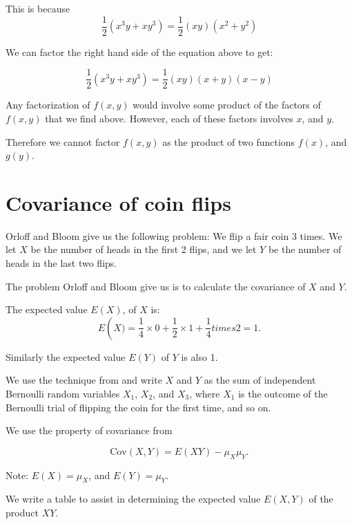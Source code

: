 \documentclass[a4paper,11pt]{article}
\begin{document}
This is because
\begin{equation}
\frac{1}{2}\left(x^3y + xy^3 \right)
 = \frac{1}{2}\left(xy\right) \left(x^2 + y^2 \right)
\end{equation}

We can factor the right hand side of the equation above
to get:

\begin{equation}
\frac{1}{2}\left(x^3y + xy^3 \right)
 = \frac{1}{2}\left(xy\right) \left(x + y\right)\left(x - y \right)
\end{equation}

Any factorization of $f\left(x, y\right)$ would involve
some product of the factors of $f\left(x, y\right)$ that
we find above.  However, each of these factors involves
$x$, and $y$.

Therefore we cannot factor $f\left( x, y \right)$ as
the product of two functions $f\left(x \right)$, and
$g\left(y \right)$.

\section{Covariance of coin flips}

Orloff and Bloom give us the following problem:
We flip a fair coin 3 times.  We let $X$ be the
number of heads in the first 2 flips, and we
let $Y$ be the number of heads in the last two flips.

The problem Orloff and Bloom give us is to calculate
the covariance of $X$ and $Y$.

The expected value $E\left( X \right)$, of $X$ 
is:
\begin{equation}
E\left(X)  = 
  \frac{1}{4}\times 0 + \frac{1}{2} \times 1 + \frac{1}{4} times 2 = 1.
\end{equation}

Similarly the expected value $E\left( Y \right)$ of $Y$ is also 1.

We use the technique from \cite{reading7b} and write $X$ and $Y$
as the sum of independent Bernoulli random variables 
$X_1$, $X_2$, and $X_3$, where $X_1$ is the outcome
of the Bernoulli trial of flipping the coin for the
first time, and so on.

We use the property of covariance from \cite{reading7b}

\begin{equation}\label{covarForm}
\text{Cov}\left(X, Y \right) = E\left( XY \right) - \mu_X\mu_Y.
\end{equation}

Note: $E\left( X \right) = \mu_X$, and $E\left( Y \right) = \mu_Y$.

We write a table to assist in determining the expected value
$E\left( X, Y \right)$ of the product $XY$.



\printbibliography{}
\end{document}
